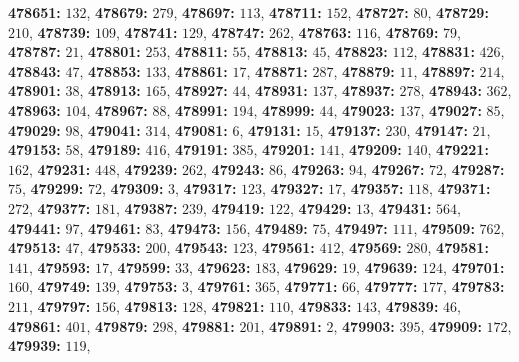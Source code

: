 \textsf{\bfseries 478651:} $132$, \textsf{\bfseries 478679:} $279$, \textsf{\bfseries 478697:} $113$, \textsf{\bfseries 478711:} $152$, \textsf{\bfseries 478727:} $80$, \textsf{\bfseries 478729:} $210$, \textsf{\bfseries 478739:} $109$, \textsf{\bfseries 478741:} $129$, \textsf{\bfseries 478747:} $262$, \textsf{\bfseries 478763:} $116$, \textsf{\bfseries 478769:} $79$, \textsf{\bfseries 478787:} $21$, \textsf{\bfseries 478801:} $253$, \textsf{\bfseries 478811:} $55$, \textsf{\bfseries 478813:} $45$, \textsf{\bfseries 478823:} $112$, \textsf{\bfseries 478831:} $426$, \textsf{\bfseries 478843:} $47$, \textsf{\bfseries 478853:} $133$, \textsf{\bfseries 478861:} $17$, \textsf{\bfseries 478871:} $287$, \textsf{\bfseries 478879:} $11$, \textsf{\bfseries 478897:} $214$, \textsf{\bfseries 478901:} $38$, \textsf{\bfseries 478913:} $165$, \textsf{\bfseries 478927:} $44$, \textsf{\bfseries 478931:} $137$, \textsf{\bfseries 478937:} $278$, \textsf{\bfseries 478943:} $362$, \textsf{\bfseries 478963:} $104$, \textsf{\bfseries 478967:} $88$, \textsf{\bfseries 478991:} $194$, \textsf{\bfseries 478999:} $44$, \textsf{\bfseries 479023:} $137$, \textsf{\bfseries 479027:} $85$, \textsf{\bfseries 479029:} $98$, \textsf{\bfseries 479041:} $314$, \textsf{\bfseries 479081:} $6$, \textsf{\bfseries 479131:} $15$, \textsf{\bfseries 479137:} $230$, \textsf{\bfseries 479147:} $21$, \textsf{\bfseries 479153:} $58$, \textsf{\bfseries 479189:} $416$, \textsf{\bfseries 479191:} $385$, \textsf{\bfseries 479201:} $141$, \textsf{\bfseries 479209:} $140$, \textsf{\bfseries 479221:} $162$, \textsf{\bfseries 479231:} $448$, \textsf{\bfseries 479239:} $262$, \textsf{\bfseries 479243:} $86$, \textsf{\bfseries 479263:} $94$, \textsf{\bfseries 479267:} $72$, \textsf{\bfseries 479287:} $75$, \textsf{\bfseries 479299:} $72$, \textsf{\bfseries 479309:} $3$, \textsf{\bfseries 479317:} $123$, \textsf{\bfseries 479327:} $17$, \textsf{\bfseries 479357:} $118$, \textsf{\bfseries 479371:} $272$, \textsf{\bfseries 479377:} $181$, \textsf{\bfseries 479387:} $239$, \textsf{\bfseries 479419:} $122$, \textsf{\bfseries 479429:} $13$, \textsf{\bfseries 479431:} $564$, \textsf{\bfseries 479441:} $97$, \textsf{\bfseries 479461:} $83$, \textsf{\bfseries 479473:} $156$, \textsf{\bfseries 479489:} $75$, \textsf{\bfseries 479497:} $111$, \textsf{\bfseries 479509:} $762$, \textsf{\bfseries 479513:} $47$, \textsf{\bfseries 479533:} $200$, \textsf{\bfseries 479543:} $123$, \textsf{\bfseries 479561:} $412$, \textsf{\bfseries 479569:} $280$, \textsf{\bfseries 479581:} $141$, \textsf{\bfseries 479593:} $17$, \textsf{\bfseries 479599:} $33$, \textsf{\bfseries 479623:} $183$, \textsf{\bfseries 479629:} $19$, \textsf{\bfseries 479639:} $124$, \textsf{\bfseries 479701:} $160$, \textsf{\bfseries 479749:} $139$, \textsf{\bfseries 479753:} $3$, \textsf{\bfseries 479761:} $365$, \textsf{\bfseries 479771:} $66$, \textsf{\bfseries 479777:} $177$, \textsf{\bfseries 479783:} $211$, \textsf{\bfseries 479797:} $156$, \textsf{\bfseries 479813:} $128$, \textsf{\bfseries 479821:} $110$, \textsf{\bfseries 479833:} $143$, \textsf{\bfseries 479839:} $46$, \textsf{\bfseries 479861:} $401$, \textsf{\bfseries 479879:} $298$, \textsf{\bfseries 479881:} $201$, \textsf{\bfseries 479891:} $2$, \textsf{\bfseries 479903:} $395$, \textsf{\bfseries 479909:} $172$, \textsf{\bfseries 479939:} $119$, 
